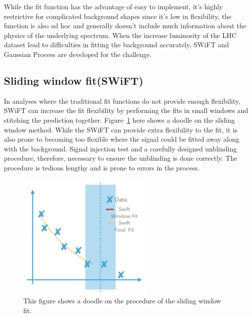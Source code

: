     While the fit function has the advantage of easy to implement, it's highly restrictive for complicated background shapes since it's low in flexibility, the function is also ad hoc and generally doesn't include much information about the physics of the underlying spectrum\cite{ATL-PHYS-PUB-2020-028}. When the increase luminosity of the LHC dataset lead to difficulties in fitting the background accurately, SWiFT and Gaussian Process are developed for the challenge. 

    \subsection{Sliding window fit(SWiFT)}
    In analyses where the traditional fit functions do not provide enough flexibility, SWiFT can increase the fit flexibility by performing the fits in small windows and stitching the prediction together. 
    Figure~\ref{fig:swift} here shows a doodle on the sliding window method. 
    While the SWiFT can provide extra flexibility to the fit, it is also prone to becoming too flexible where the signal could be fitted away along with the background. Signal injection test and a carefully designed unblinding procedure, therefore, necessary to ensure the unblinding is done correctly. The procedure is tedious lengthy and is prone to errors in the process.
    

\begin{figure}[!htb]
    \begin{center}
        \includegraphics[width=0.6\textwidth]{figures/chapter_analysismethod/swift2}
        \caption{
            This figure shows a doodle on the procedure of the sliding window fit. 
        }
        \label{fig:swift}
    \end{center}
\end{figure}


